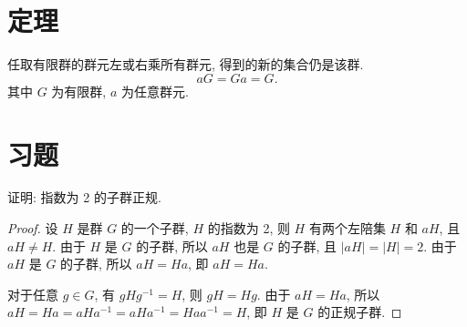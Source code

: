 
    \section{定理}
        \begin{theorem}
            任取有限群的群元左或右乘所有群元, 得到的新的集合仍是该群.
            $$
            aG = Ga = G.
            $$
            其中 $G$ 为有限群, $a$ 为任意群元.
        \end{theorem}

    \section{习题}  

        \begin{example}
            证明: 指数为 2 的子群正规.
        \end{example}

        \begin{proof}
            设 $H$ 是群 $G$ 的一个子群, $H$ 的指数为 2, 则 $H$ 有两个左陪集 $H$ 和 $aH$, 且 $aH \neq H$. 由于 $H$ 是 $G$ 的子群, 所以 $aH$ 也是 $G$ 的子群, 且 $|aH| = |H| = 2$. 由于 $aH$ 是 $G$ 的子群, 所以 $aH = Ha$, 即 $aH = Ha$.

            对于任意 $g \in G$, 有 $gHg^{-1} = H$, 则 $gH = Hg$. 由于 $aH = Ha$, 所以 $aH = Ha = aHa^{-1} = aHa^{-1} = Haa^{-1} = H$, 即 $H$ 是 $G$ 的正规子群.
        \end{proof}